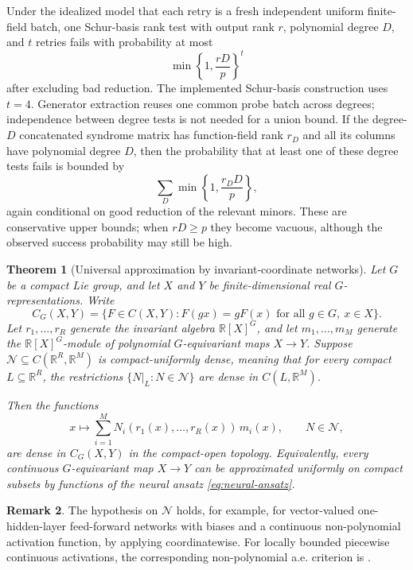 \documentclass[11pt]{article}
\newcommand{\dsR}{\mathbb{R}}
\newcommand{\scN}{\mathcal{N}}
\newcommand{\set}[1]{\{#1\}}
\newtheorem{theorem}{Theorem}[section]
\theoremstyle{definition}
\newtheorem{remark}[theorem]{Remark}
\begin{document}
Under the idealized model that each retry is a fresh independent uniform finite-field batch, one Schur-basis rank test with output rank $r$, polynomial degree $D$, and $t$ retries fails with probability at most
\[
  \min\left\{1,\frac{rD}{p}\right\}^{t}
\]
after excluding bad reduction.
The implemented Schur-basis construction uses $t=4$.
Generator extraction reuses one common probe batch across degrees; independence between degree tests is not needed for a union bound.
If the degree-$D$ concatenated syndrome matrix has function-field rank $r_D$ and all its columns have polynomial degree $D$, then the probability that at least one of these degree tests fails is bounded by
\[
  \sum_D \min\left\{1,\frac{r_DD}{p}\right\},
\]
again conditional on good reduction of the relevant minors.
These are conservative upper bounds; when $rD\ge p$ they become vacuous, although the observed success probability may still be high.

\begin{theorem}[Universal approximation by invariant-coordinate networks]\label{thm:universal-approximation}
  Let $G$ be a compact Lie group, and let $X$ and $Y$ be finite-dimensional real $G$-representations.
  Write
  \[
    C_G(X,Y)
    =
    \set{F\in C(X,Y):F(gx)=gF(x)\text{ for all }g\in G,\ x\in X}.
  \]
  Let $r_1,\dots,r_R$ generate the invariant algebra $\dsR[X]^G$, and let $m_1,\dots,m_M$ generate the $\dsR[X]^G$-module of polynomial $G$-equivariant maps $X\to Y$.
  Suppose $\scN\subseteq C(\dsR^R,\dsR^M)$ is compact-uniformly dense, meaning that for every compact $L\subseteq\dsR^R$, the restrictions $\set{N|_L:N\in\scN}$ are dense in $C(L,\dsR^M)$.

  Then the functions
  \[
    x
    \longmapsto
    \sum_{i=1}^M N_i(r_1(x),\dots,r_R(x))\,m_i(x),
    \qquad
    N\in\scN,
  \]
  are dense in $C_G(X,Y)$ in the compact-open topology.
  Equivalently, every continuous $G$-equivariant map $X\to Y$ can be approximated uniformly on compact subsets by functions of the neural ansatz \eqref{eq:neural-ansatz}.
\end{theorem}

\begin{remark}
  The hypothesis on $\scN$ holds, for example, for vector-valued one-hidden-layer feed-forward networks with biases and a continuous non-polynomial activation function, by applying \cite[Theorem~3.1, p.~153]{Pinkus1999} coordinatewise.
  For locally bounded piecewise continuous activations, the corresponding non-polynomial a.e. criterion is \cite[Theorem~1, p.~863]{LeshnoLinPinkusSchocken1993}.
\end{remark}
\end{document}
